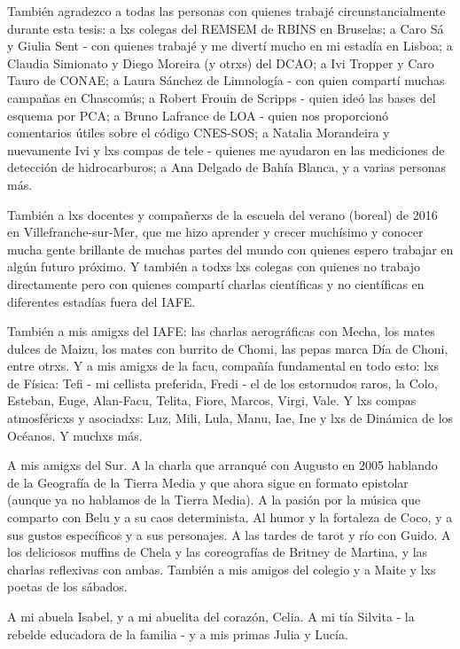 También agradezco a todas las personas con quienes trabajé circunstancialmente durante esta tesis: a lxs colegas del REMSEM de RBINS en Bruselas; a Caro Sá y Giulia Sent - con quienes trabajé y me divertí mucho en mi estadía en Lisboa; a Claudia Simionato y Diego Moreira (y otrxs) del DCAO; a Ivi Tropper y Caro Tauro de CONAE; a Laura Sánchez de Limnología - con quien compartí muchas campañas en Chascomús; a Robert Frouin de Scripps - quien ideó las bases del esquema por PCA; a Bruno Lafrance de LOA - quien nos proporcionó comentarios útiles sobre el código CNES-SOS; a Natalia Morandeira y nuevamente Ivi y lxs compas de tele - quienes me ayudaron en las mediciones de detección de hidrocarburos; a Ana Delgado de Bahía Blanca, y a varias personas más.

También a lxs docentes y compañerxs de la escuela del verano (boreal) de 2016 en Villefranche-sur-Mer, que me hizo aprender y crecer muchísimo y conocer mucha gente brillante de muchas partes del mundo con quienes espero trabajar en algún futuro próximo. Y también a todxs lxs colegas con quienes no trabajo directamente pero con quienes compartí charlas científicas y no científicas en diferentes estadías fuera del IAFE.

También a mis amigxs del IAFE: las charlas aerográficas con Mecha, los mates dulces de Maizu, los mates con burrito de Chomi, las pepas marca Día de Choni, entre otrxs. Y a mis amigxs de la facu, compañía fundamental en todo esto: lxs de Física: Tefi - mi cellista preferida, Fredi - el de los estornudos raros, la Colo, Esteban, Euge, Alan-Facu, Telita, Fiore, Marcos, Virgi, Vale. Y lxs compas atmosféricxs y asociadxs: Luz, Mili, Lula, Manu, Iae, Ine y lxs de Dinámica de los Océanos. Y muchxs más.

A mis amigxs del Sur. A la charla que arranqué con Augusto en 2005 hablando de la Geografía de la Tierra Media y que ahora sigue en formato epistolar (aunque ya no hablamos de la Tierra Media). A la pasión por la música que comparto con Belu y a su caos determinista. Al humor y la fortaleza de Coco, y a sus gustos específicos y a sus personajes. A las tardes de tarot y río con Guido. A los deliciosos muffins de Chela y las coreografías de Britney de Martina, y las charlas reflexivas con ambas. También a mis amigos del colegio y a Maite y lxs poetas de los sábados.

A mi abuela Isabel, y a mi abuelita del corazón, Celia. A mi tía Silvita - la rebelde educadora de la familia - y a mis primas Julia y Lucía.

